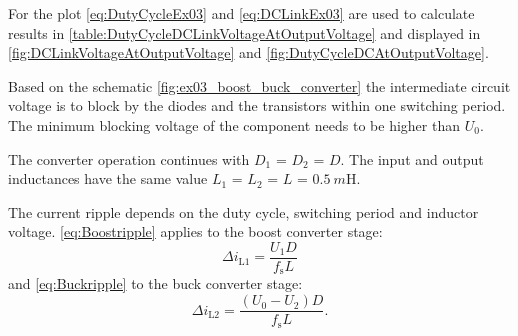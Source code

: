 
\begin{solutionblock}
    For the plot \eqref{eq:DutyCycleEx03} and \eqref{eq:DCLinkEx03} are used to calculate results in \autoref{table:DutyCycleDCLinkVoltageAtOutputVoltage} 
    and displayed in \autoref{fig:DCLinkVoltageAtOutputVoltage} and \autoref{fig:DutyCycleDCAtOutputVoltage}.

    
    
    

\end{solutionblock}


\begin{solutionblock}
    Based on the schematic \autoref{fig:ex03_boost_buck_converter} the intermediate circuit voltage is to block by the diodes and 
    the transistors within one switching period. The minimum blocking voltage of the component needs to be higher than $U_\mathrm{0}$.
\end{solutionblock}

\vspace{2em}\par
The converter operation continues with $D_\mathrm{1}$ = $D_\mathrm{2}$ = $D$. The input and output inductances 
have the same value $L_\mathrm{1}$ = $L_\mathrm{2}$ = $L$ = $\SI{0.5}{m\henry}$.


\begin{solutionblock}
    The current ripple depends on the duty cycle, switching period and inductor voltage.
    \eqref{eq:Boostripple} applies to the boost converter stage:
    \begin{equation}
        \Delta i_\mathrm{L1}=\frac{U_\mathrm{1}D}{f_\mathrm{s}L}
        \label{eq:Boostripple}
    \end{equation}
    and \eqref{eq:Buckripple} to the buck converter stage:
    \begin{equation}
        \Delta i_\mathrm{L2}=\frac{\left(U_\mathrm{0}-U_\mathrm{2}\right)D}{f_\mathrm{s}L}.
        \label{eq:Buckripple}
    \end{equation}
\end{solutionblock}

